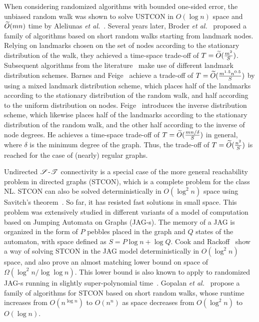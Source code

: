 \documentclass[11pt,a4paper]{article}
\newcommand{\Broder}{Broder \etal}
\newcommand{\etal}{\textsl{et al.}\xspace}
\renewcommand{\O}{\ensuremath \widetilde O}
\newcommand{\s}{\ensuremath  \mathscr S}
\renewcommand{\t}{\ensuremath \mathscr  T}
\renewcommand{\*}{\hspace*{5mm}}
\begin{document}
When considering randomized algorithms with bounded one-sided error, the unbiased random walk was shown to solve USTCON in $O(\log n)$ space and $\O(mn)$ time by Aleliunas \etal~\cite{AKLLR}. Several years later, \Broder~\cite{BKRU} proposed a family of algorithms based on short random walks starting from landmark nodes. Relying on landmarks chosen on the set of nodes according to the stationary distribution of the walk, they achieved a time-space trade-off of $T= \O (\frac{m^2}{S})$. Subsequent algorithms from the literature~\cite{BF,F} make use of different landmark distribution schemes. Barnes and Feige~\cite{BF} achieve a trade-off of $T = \O (\frac{m^{1.5}n^{0.5}}{S})$ by using a mixed landmark distribution scheme, which places half of the landmarks according to the stationary distribution of the random walk, and half according to the uniform distribution on nodes. Feige~\cite{F} introduces the inverse distribution scheme, which likewise places half of the landmarks according to the stationary distribution of the random walk, and the other half according to the inverse of node degrees. He achieves a time-space trade-off of $T = \O (\frac{mn /\delta}{S})$ in general, where $\delta$ is the minimum degree of the graph. Thus, the trade-off of $T = \O (\frac{n^2}{S})$ is reached for the case of (nearly) regular graphs.

Undirected $\s$-$\t$ connectivity is a special case of the more general reachability problem in directed graphs (STCON), which is a complete problem for the class NL. STCON can also be solved deterministically in $O(\log^2 n)$ space using Savitch's theorem~\cite{Sav}. So far, it has resisted fast solutions in small space. This problem was extensively studied in different variants of a model of computation based on Jumping Automata on Graphs (JAG-s). The memory of a JAG is organized in the form of $P$ pebbles placed in the graph and $Q$ states of the automaton, with space defined as $S = P \log n + \log Q$. Cook and Rackoff~\cite{CR} show a way of solving STCON in the JAG model deterministically in $O(\log^2 n)$ space, and also prove an almost matching lower bound on space of $\Omega(\log^2 n /\log \log n)$. This lower bound is also known to apply to randomized JAG-s running in slightly super-polynomial time~\cite{BS}. Gopalan \etal~\cite{GLM} propose a family of algorithms for STCON based on short random walks, whose runtime increases from $O(n^{\log n})$ to $O(n^n)$ as space decreases from $O(\log^2 n)$ to $O(\log n)$.
\end{document}
